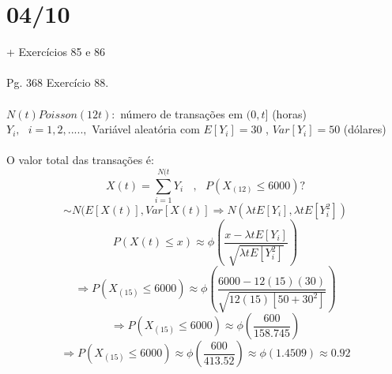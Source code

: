 \documentclass[a4paper,12pt]{article}
\begin{document}
 \section*{04/10 }
 + Exercícios  85 e 86\\
 \\
 Pg.  368 Exercício 88.\\
 \\
 $N(t)Poisson(12t):$ número de transações em $(0,t]$ (horas)\\
 $Y_i, \ \ \ i=1,2,.....,$ Variável aleatória com $E[Y_i]=30$ , $Var[Y_i]=50$ (dólares)\\
 \\
 O valor total das transações é:
 $$X(t)=\sum\limits_{i=1}^{N(t}Y_i \ \ \ \ , \ \ \ P(X_{(12)}\le6000)?$$
 $$\sim N(E[X(t)],Var[X(t)]\Rightarrow N(\lambda t E[Y_i],\lambda t E[Y_i^2])$$
  $$P(X(t)\le x)\approx\phi\left(\frac{x-\lambda tE[Y_i]}{\sqrt{\lambda tE[Y_i^2]}}\right) $$
    $$\Rightarrow P(X_{(15)}\le 6000)\approx\phi\left(\frac{6000-12(15)(30)}{\sqrt{12(15)[50+30^2]}}\right) $$
     $$\Rightarrow P(X_{(15)}\le 6000)\approx\phi\left(\frac{600}{158.745}\right) $$
          $$\Rightarrow P(X_{(15)}\le 6000)\approx\phi\left(\frac{600}{413.52}\right)\approx\phi(1.4509)\approx 0.92$$
          \newpage
\end{document}

